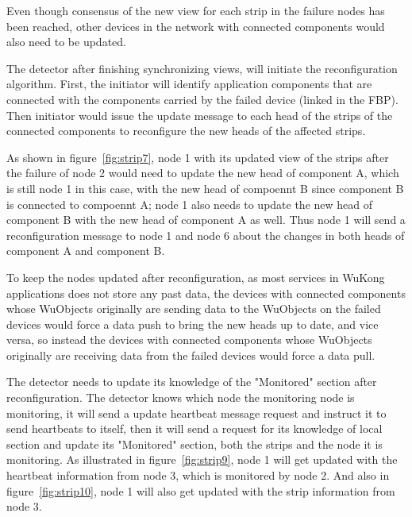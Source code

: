 Even though consensus of the new view for each strip in the failure nodes has been
reached, other devices in the network with connected components would also need
to be updated. 

The detector after finishing synchronizing views, will initiate
the reconfiguration algorithm. First, the initiator will identify application components
that are connected with the components carried by the failed device (linked in the
FBP). Then initiator would issue the update message to each head of the strips of the connected components
to reconfigure the new heads of the affected strips.

As shown in figure~\ref{fig:strip7}, node 1 with its updated view of the strips
after the failure of node 2 would need to update the new head of component A,
which is still node 1 in this case, with the new head of compoennt B since
component B is connected to compoennt A; node 1 also needs to update the new
head of component B with the new head of component A as well. Thus node 1 will
send a reconfiguration message to node 1 and node 6 about the changes in both
heads of component A and component B.

To keep the nodes updated after reconfiguration, as most services in WuKong
applications does not store any past data, the devices with connected components whose WuObjects
originally are sending data to the WuObjects on the failed devices would force a data push to
bring the new heads up to date, and vice versa, so instead the devices with
connected components whose WuObjects originally are receiving data from the
failed devices would force a data pull.

The detector needs to update its knowledge of the "Monitored" section after
reconfiguration. The detector knows which node the monitoring node is
monitoring, it will send a update heartbeat message request and instruct it to
send heartbeats to itself, then it will send a request for its knowledge of
local section and update its "Monitored" section, both the strips and the node
it is monitoring. As illustrated in figure~\ref{fig:strip9}, node 1 will get
updated with the heartbeat information from node 3, which is monitored by node
2. And also in figure~\ref{fig:strip10}, node 1 will also get updated with the strip
information from node 3.


